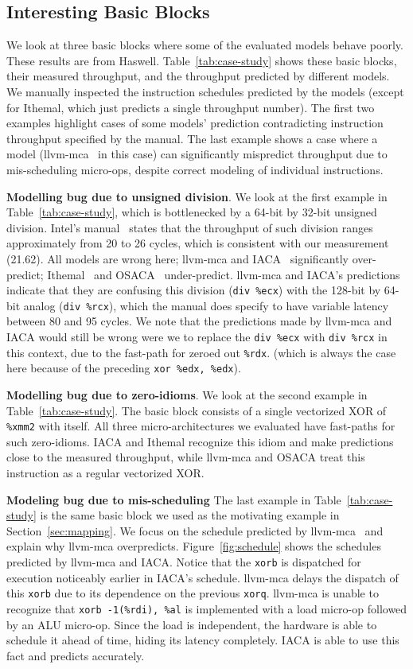 \subsection{Interesting Basic Blocks}
We look at three basic blocks where some of the evaluated models behave poorly.
These results are from Haswell.
Table~\ref{tab:case-study} shows these basic blocks, their 
measured throughput, and the throughput predicted by different models.
We manually inspected the instruction schedules predicted by the models
(except for Ithemal, which just predicts a single throughput number).
The first two examples highlight cases of some models' prediction
contradicting instruction throughput specified by the manual.
The last example shows a case where a model (llvm-mca~\cite{llvm-mca} in this case) can significantly
mispredict throughput due to mis-scheduling micro-ops, despite correct modeling of individual instructions.

\textbf{Modelling bug due to unsigned division}.
We look at the first example in Table~\ref{tab:case-study},
which is bottlenecked by a 64-bit by 32-bit unsigned division.
Intel's manual~\cite{intel-manual} states that the throughput of such division
ranges approximately from 20 to 26 cycles, which is consistent with our measurement (21.62).
All models are wrong here; llvm-mca and IACA~\cite{iaca} significantly over-predict;
Ithemal~\cite{ithemal} and OSACA~\cite{osaca} under-predict.
llvm-mca and IACA's predictions indicate that they are confusing 
this division (\verb|div %ecx|) with the 128-bit by 64-bit analog (\verb|div %rcx|),
which the manual does specify to have variable latency between 80 and 95 cycles.
We note that the predictions made by llvm-mca and IACA would still be wrong
were we to replace the \verb|div %ecx| with \verb|div %rcx| in this context,
due to the fast-path for zeroed out \verb|%rdx|.
(which is always the case here because of the preceding \verb|xor %edx, %edx|).

\textbf{Modelling bug due to zero-idioms}.
We look at the second example in Table~\ref{tab:case-study}.
The basic block consists of a single vectorized XOR of \verb|%xmm2| with itself.
All three micro-architectures we evaluated have fast-paths for such zero-idioms. 
IACA and Ithemal recognize this idiom and make predictions close to the measured throughput,
while llvm-mca and OSACA treat this instruction as a regular vectorized XOR.

\textbf{Modeling bug due to mis-scheduling}
The last example in Table~\ref{tab:case-study} is the same basic block
we used as the motivating example in Section~\ref{sec:mapping}.
We focus on the schedule predicted by llvm-mca~\cite{llvm-mca}
and explain why llvm-mca overpredicts.
Figure~\ref{fig:schedule} shows the schedules predicted by llvm-mca and IACA.
Notice that the \verb|xorb| is dispatched for execution noticeably earlier in IACA's schedule.
llvm-mca delays the dispatch of this \verb|xorb| due to its dependence on the previous \verb|xorq|.
llvm-mca is unable to recognize that 
\verb|xorb -1(%rdi), %al| is implemented with a load micro-op followed by an ALU micro-op.
Since the load is independent, the hardware is able to schedule it ahead of time,
hiding its latency completely.
IACA is able to use this fact and predicts accurately.

